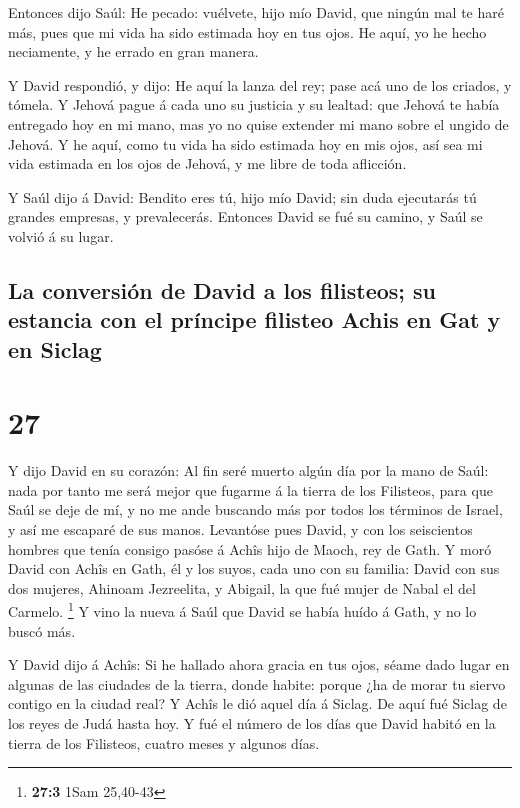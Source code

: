  Entonces dijo Saúl: He pecado: vuélvete, hijo mío David,
que ningún mal te haré más, pues que mi vida ha sido estimada hoy en tus
ojos. He aquí, yo he hecho neciamente, y he errado en gran manera.

 Y David respondió, y dijo: He aquí la lanza del rey;
pase acá uno de los criados, y tómela.  Y Jehová pague á
cada uno su justicia y su lealtad: que Jehová te había entregado hoy en
mi mano, mas yo no quise extender mi mano sobre el ungido de Jehová.
 Y he aquí, como tu vida ha sido estimada hoy en mis
ojos, así sea mi vida estimada en los ojos de Jehová, y me libre de toda
aflicción.

 Y Saúl dijo á David: Bendito eres tú, hijo mío David;
sin duda ejecutarás tú grandes empresas, y prevalecerás. Entonces David
se fué su camino, y Saúl se volvió á su lugar.

\hypertarget{la-conversiuxf3n-de-david-a-los-filisteos-su-estancia-con-el-pruxedncipe-filisteo-achis-en-gat-y-en-siclag}{%
\subsection{La conversión de David a los filisteos; su estancia con el
príncipe filisteo Achis en Gat y en
Siclag}\label{la-conversiuxf3n-de-david-a-los-filisteos-su-estancia-con-el-pruxedncipe-filisteo-achis-en-gat-y-en-siclag}}

\hypertarget{section-26}{%
\section{27}\label{section-26}}

 Y dijo David en su corazón: Al fin seré muerto algún día
por la mano de Saúl: nada por tanto me será mejor que fugarme á la
tierra de los Filisteos, para que Saúl se deje de mí, y no me ande
buscando más por todos los términos de Israel, y así me escaparé de sus
manos.  Levantóse pues David, y con los seiscientos
hombres que tenía consigo pasóse á Achîs hijo de Maoch, rey de Gath.
 Y moró David con Achîs en Gath, él y los suyos, cada uno
con su familia: David con sus dos mujeres, Ahinoam Jezreelita, y
Abigail, la que fué mujer de Nabal el del Carmelo. \footnote{\textbf{27:3}
  1Sam 25,40-43}  Y vino la nueva á Saúl que David se
había huído á Gath, y no lo buscó más.

 Y David dijo á Achîs: Si he hallado ahora gracia en tus
ojos, séame dado lugar en algunas de las ciudades de la tierra, donde
habite: porque ¿ha de morar tu siervo contigo en la ciudad real?
 Y Achîs le dió aquel día á Siclag. De aquí fué Siclag de
los reyes de Judá hasta hoy.  Y fué el número de los días
que David habitó en la tierra de los Filisteos, cuatro meses y algunos
días.

